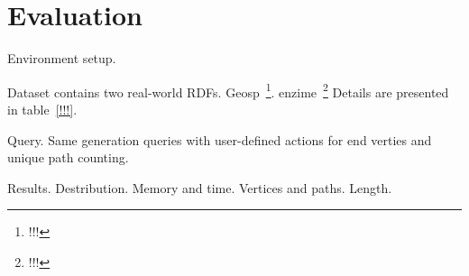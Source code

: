 \section{Evaluation}

Environment setup.

Dataset contains two real-world RDFs.
Geosp~\footnote{!!!}.
enzime~\footnote{!!!}
Details are presented in table~\ref{!!!}.

Query. Same generation queries with user-defined actions for end verties and unique path counting.

Results.
Destribution. Memory and time. Vertices and paths. Length.
